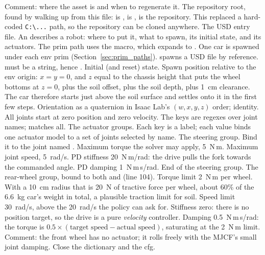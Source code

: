 \begin{explain}
 Comment: where the asset is and when to regenerate it.
 The repository root, found by walking up from this file:
   is ,  is
  ,  is the repository. This
  replaced a hard-coded \texttt{C:\textbackslash ...} path, so the repository can be cloned
  anywhere.
 The USD entry file.
 An  describes a robot: where to put it, what to
  spawn, its initial state, and its actuators.
 The prim path uses the  macro, which
   expands to . One car is
  spawned under each env prim (Section~\ref{sec:prim_paths}).
  spawns a USD file by reference. 
  must be a string, hence .
 Initial (and reset) state.
 Spawn position relative to the env origin: $x=y=0$, and $z$ equal to
  the chassis height that puts the wheel bottoms at $z=0$, plus the soil
  offset, plus the soil depth, plus 1~cm clearance. The car therefore starts
  just above the soil surface and settles onto it in the first few steps.
 Orientation as a quaternion in Isaac Lab's $(w, x, y, z)$ order;
  identity.
 All joints start at zero position and zero velocity. The keys
  are regexes over joint names;  matches all.
 The actuator groups. Each key is a label; each value binds one
  actuator model to a set of joints selected by name.
 The steering group.
 Bind it to the joint named .
 Maximum torque the solver may apply, 5~N\,m.
 Maximum joint speed, 5~rad/s.
 PD stiffness 20~N\,m/rad: the drive pulls the fork towards the
  commanded angle.
 PD damping 1~N\,m\,s/rad.
 End of the steering group.
 The rear-wheel group, bound to both  and
   (line 104).
 Torque limit 2~N\,m per wheel. With a 10~cm radius that is 20~N of
  tractive force per wheel, about 60\% of the 6.6~kg car's weight in total, a
  plausible traction limit for soil.
 Speed limit 30~rad/s, above the 20~rad/s the policy can ask for.
 Stiffness zero: there is no position target, so the drive is a pure
  \emph{velocity} controller.
 Damping 0.5~N\,m\,s/rad: the torque is $0.5\times(\text{target speed}
  - \text{actual speed})$, saturating at the 2~N\,m limit.
 Comment: the front wheel has no actuator; it rolls freely with the
  MJCF's small joint damping.
 Close the dictionary and the cfg.
\end{explain}

